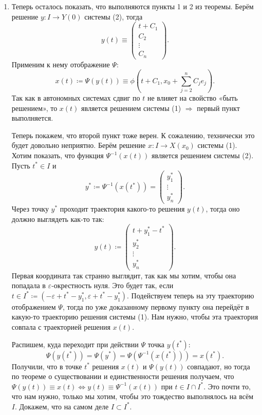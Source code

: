 \begin{enumerate}
    \item Теперь осталось показать, что выполняются пункты 1 и 2 из теоремы.
    Берём решение $y\colon I \to Y(0)$ системы (2), тогда \[y(t) \equiv \begin{pmatrix}
        t + C_1\\
        C_2\\
        \vdots\\
        C_n
    \end{pmatrix}.\]
    Применим к нему отображение $\Psi$:
    \[
        x(t) \coloneq \Psi(y(t)) \equiv \phi(t + C_1, x_0 + \sum_{j=2}^n C_je_j).
    \]
    Так как в автономных системах сдвиг по $t$ не влияет на свойство «быть решением», то $x(t)$ является решением системы (1) $\Rightarrow$ первый пункт выполняется.

    Теперь покажем, что второй пункт тоже верен. К сожалению, технически это будет довольно неприятно. Берём решение $x\colon I \to X(x_0)$ системы (1). Хотим показать, что функция $\Psi^{-1}(x(t))$ является решением системы (2). Пусть $t^* \in I$ и \[y^* \coloneq \Psi^{-1}(x(t^*)) = \begin{pmatrix}
        y_1^*\\
        \vdots\\
        y_n^*
    \end{pmatrix}.\]
    Через точку $y^*$ проходит траектория какого-то решения $y(t)$, тогда оно должно выглядеть как-то так:
    \[
        y(t) \coloneq \begin{pmatrix}
            t + y_1^* -t^*\\
            y_2^*\\
            \vdots\\
            y_n^*
        \end{pmatrix}.
    \]
    Первая координата так странно выглядит, так как мы хотим, чтобы она попадала в $\varepsilon$-окрестность нуля. Это будет так, если $t \in I^* \coloneq (-\varepsilon + t^* - y_1^*, \varepsilon + t^* - y_1^*)$. Подействуем теперь на эту траекторию отображением $\Psi$, тогда по уже доказанному первому пункту она перейдёт в какую-то траекторию решения системы (1). Нам нужно, чтобы эта траектория совпала с траекторией решения $x(t)$.

    Распишем, куда переходит при действии $\Psi$ точка $y(t^*)$:
    \[
        \Psi(y(t^*)) = \Psi(y^*) = \Psi(\Psi^{-1}(x(t^*))) = x(t^*).
    \]
    Получили, что в точке $t^*$ решения $x(t)$ и $\Psi(y(t))$ совпадают, но тогда по теореме о существовании и единственности решения получаем, что $\Psi(y(t)) \equiv x(t) \Leftrightarrow y(t) \equiv \Psi^{-1}(x(t))$ при $t \in I \cap I^*$. Это почти то, что нам нужно, только мы хотим, чтобы это тождество выполнялось на всём $I$. Докажем, что на самом деле $I \subset I^*$.


\end{enumerate}
